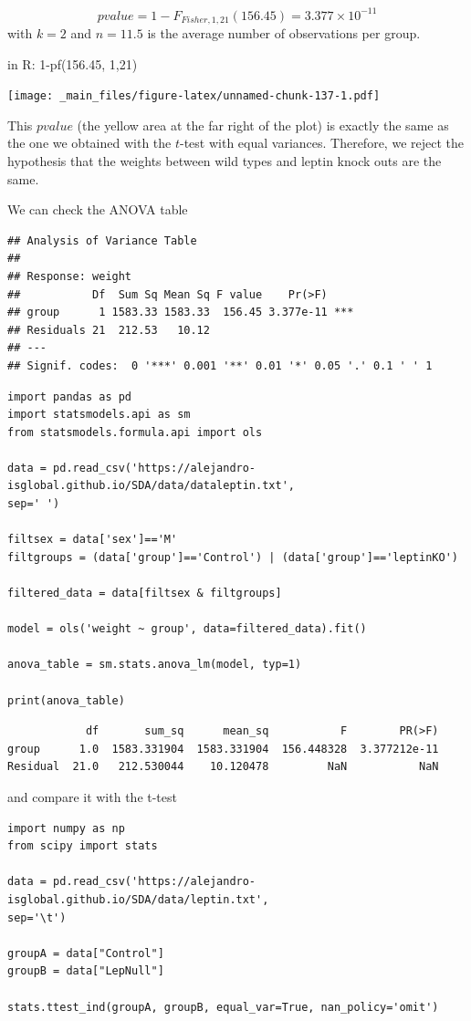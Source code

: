 \documentclass[
]{book}
\begin{document}
\[pvalue=1-F_{Fisher,1,21}(156.45)=3.377 \times 10^{-11}\] with \(k=2\) and \(n=11.5\) is the average number of observations per group.

in R: 1-pf(156.45, 1,21)

\texttt{[image: \_main\_files/figure-latex/unnamed-chunk-137-1.pdf]}

This \(pvalue\) (the yellow area at the far right of the plot) is exactly the same as the one we obtained with the \(t\)-test with equal variances. Therefore, we reject the hypothesis that the weights between wild types and leptin knock outs are the same.

We can check the ANOVA table

\begin{verbatim}
## Analysis of Variance Table
## 
## Response: weight
##           Df  Sum Sq Mean Sq F value    Pr(>F)    
## group      1 1583.33 1583.33  156.45 3.377e-11 ***
## Residuals 21  212.53   10.12                      
## ---
## Signif. codes:  0 '***' 0.001 '**' 0.01 '*' 0.05 '.' 0.1 ' ' 1
\end{verbatim}

\begin{verbatim}
import pandas as pd
import statsmodels.api as sm
from statsmodels.formula.api import ols

data = pd.read_csv('https://alejandro-isglobal.github.io/SDA/data/dataleptin.txt', 
sep=' ')

filtsex = data['sex']=='M'
filtgroups = (data['group']=='Control') | (data['group']=='leptinKO')

filtered_data = data[filtsex & filtgroups]

model = ols('weight ~ group', data=filtered_data).fit()

anova_table = sm.stats.anova_lm(model, typ=1)

print(anova_table)
\end{verbatim}

\begin{verbatim}
            df       sum_sq      mean_sq           F        PR(>F)
group      1.0  1583.331904  1583.331904  156.448328  3.377212e-11
Residual  21.0   212.530044    10.120478         NaN           NaN
\end{verbatim}

and compare it with the t-test

\begin{verbatim}
import numpy as np
from scipy import stats

data = pd.read_csv('https://alejandro-isglobal.github.io/SDA/data/leptin.txt', 
sep='\t')

groupA = data["Control"]
groupB = data["LepNull"]

stats.ttest_ind(groupA, groupB, equal_var=True, nan_policy='omit')
\end{verbatim}
\end{document}
